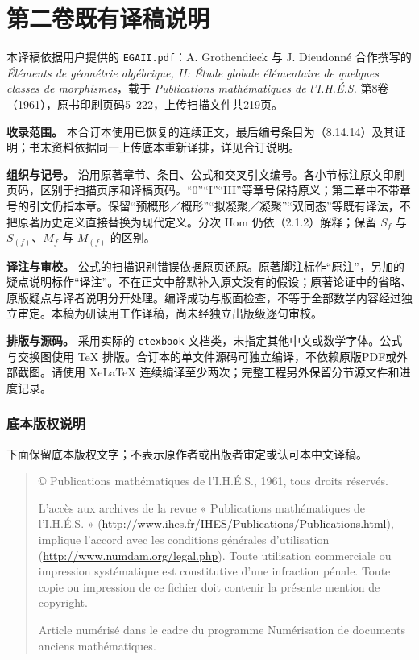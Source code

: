 \chapter*{第二卷既有译稿说明}
本译稿依据用户提供的 \texttt{EGAII.pdf}：A. Grothendieck 与 J. Dieudonné 合作撰写的 \textit{Éléments de géométrie algébrique, II: Étude globale élémentaire de quelques classes de morphismes}，载于 \textit{Publications mathématiques de l'I.H.É.S.} 第8卷（1961），原书印刷页码5--222，上传扫描文件共219页。

\textbf{收录范围。} 本合订本使用已恢复的连续正文，最后编号条目为（8.14.14）及其证明；书末资料依据同一上传底本重新译排，详见合订说明。

\textbf{组织与记号。} 沿用原著章节、条目、公式和交叉引文编号。各小节标注原文印刷页码，区别于扫描页序和译稿页码。“0”“I”“III”等章号保持原义；第二章中不带章号的引文仍指本章。保留“预概形／概形”“拟凝聚／凝聚”“双同态”等既有译法，不把原著历史定义直接替换为现代定义。分次 Hom 仍依（2.1.2）解释；保留 $S_f$ 与 $S_{(f)}$、$M_f$ 与 $M_{(f)}$ 的区别。

\textbf{译注与审校。} 公式的扫描识别错误依据原页还原。原著脚注标作“原注”，另加的疑点说明标作“译注”。不在正文中静默补入原文没有的假设；原著论证中的省略、原版疑点与译者说明分开处理。编译成功与版面检查，不等于全部数学内容经过独立审定。本稿为研读用工作译稿，尚未经独立出版级逐句审校。

\textbf{排版与源码。} 采用实际的 \texttt{ctexbook} 文档类，未指定其他中文或数学字体。公式与交换图使用 TeX 排版。合订本的单文件源码可独立编译，不依赖原版PDF或外部截图。请使用 XeLaTeX 连续编译至少两次；完整工程另外保留分节源文件和进度记录。

\subsection*{底本版权说明}
下面保留底本版权文字；不表示原作者或出版者审定或认可本中文译稿。
\begin{quote}\small
© Publications mathématiques de l'I.H.É.S., 1961, tous droits réservés.

L'accès aux archives de la revue « Publications mathématiques de l'I.H.É.S. » (\url{http://www.ihes.fr/IHES/Publications/Publications.html}), implique l'accord avec les conditions générales d'utilisation (\url{http://www.numdam.org/legal.php}). Toute utilisation commerciale ou impression systématique est constitutive d'une infraction pénale. Toute copie ou impression de ce fichier doit contenir la présente mention de copyright.

Article numérisé dans le cadre du programme Numérisation de documents anciens mathématiques.
\end{quote}


